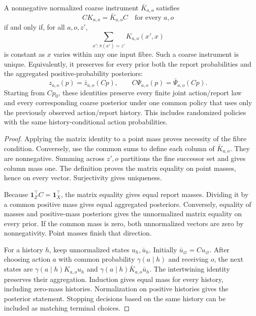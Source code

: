 \begin{Coretheorem}\label{Core:r:instrument}
A nonnegative normalized coarse instrument $\bar K_{a,o}$ satisfies
\[
 CK_{a,o}=\bar K_{a,o}C\quad\text{for every }a,o
\]
if and only if, for all $a,o,z'$,
\[
 \sum_{x':\pi(x')=z'}K_{a,o}(x',x)
\]
is constant as $x$ varies within any one input fibre. Such a coarse instrument is unique. Equivalently, it preserves for every prior both the report probabilities and the aggregated positive-probability posteriors:
\[
 z_{a,o}(p)=\bar z_{a,o}(Cp),\qquad C\Psi_{a,o}(p)=\bar\Psi_{a,o}(Cp).
\]
Starting from $Cp_0$, these identities preserve every finite joint action/report law and every corresponding coarse posterior under one common policy that uses only the previously observed action/report history. This includes randomized policies with the same history-conditional action probabilities.
\end{Coretheorem}
\begin{proof}
Applying the matrix identity to a point mass proves necessity of the fibre condition. Conversely, use the common sums to define each column of $\bar K_{a,o}$. They are nonnegative. Summing across $z',o$ partitions the fine successor set and gives column mass one. The definition proves the matrix equality on point masses, hence on every vector. Surjectivity gives uniqueness.

Because $\mathbf1_Z^\top C=\mathbf1_X^\top$, the matrix equality gives equal report masses. Dividing it by a common positive mass gives equal aggregated posteriors. Conversely, equality of masses and positive-mass posteriors gives the unnormalized matrix equality on every prior. If the common mass is zero, both unnormalized vectors are zero by nonnegativity. Point masses finish that direction.

For a history $h$, keep unnormalized states $u_h,\bar u_h$. Initially $\bar u_\varnothing=Cu_\varnothing$. After choosing action $a$ with common probability $\gamma(a\mid h)$ and receiving $o$, the next states are $\gamma(a\mid h)K_{a,o}u_h$ and $\gamma(a\mid h)\bar K_{a,o}\bar u_h$. The intertwining identity preserves their aggregation. Induction gives equal mass for every history, including zero-mass histories. Normalization on positive histories gives the posterior statement. Stopping decisions based on the same history can be included as matching terminal choices.
\end{proof}

